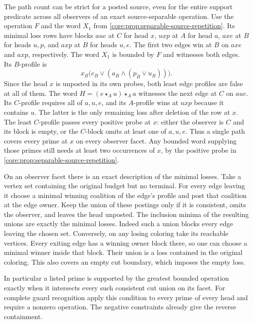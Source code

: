The path count can be strict for a posted source, even for
the entire support predicate across all observers of an exact
source-separable operation. Use the operation $F$
and the word $X_1$ from
\cref{core:prop:separable-source-repetition}.
Its minimal loss rows have blocks $aue$ at $C$ for head $x$,
$uxp$ at $A$ for head $a$, $axe$ at $B$ for heads $u,p$,
and $axp$ at $B$ for heads $u,e$.
The first two edges win at $B$ on $axe$ and $axp$, respectively.
The word $X_1$ is bounded by $F$ and witnesses both edges.
Its $B$-profile is
\[
   x_B\bigl(e_B\vee (a_B\wedge(p_B\vee u_B))\bigr).
\]
Since the head $x$ is unposted in its own probes, both
least edge profiles are false at all of them. The word
$H=(e\star_A u)\star_A a$ witnesses the next edge at $C$
on $aue$. Its $C$-profile requires all of $a,u,e$, and
its $A$-profile wins at $uxp$ because it contains $u$.
The latter is the only remaining loss after deletion of
the row at $x$. The least $C$-profile passes every
positive probe at $x$: either the observer is $C$ and
its block is empty, or the $C$-block omits at least one
of $a,u,e$. Thus a single path covers every prime at $x$
on every observer facet.
Any bounded word supplying those primes still needs at
least two occurrences of $x$, by the positive probe
in \cref{core:prop:separable-source-repetition}.

On an observer facet there is an exact description
of the minimal losses. Take a vertex set containing
the original budget but no terminal. For every edge
leaving it choose a minimal winning coalition of the
edge's profile and post that coalition at the edge
owner. Keep the union of these postings only if it
is consistent, omits the observer, and leaves the head
unposted.
The inclusion minima of the resulting unions are exactly the
minimal losses. Indeed such a union blocks every
edge leaving the chosen set. Conversely, on any
losing coloring take its reachable vertices.
Every exiting edge has a winning owner block there,
so one can choose a minimal winner inside that
block. Their union is a loss contained in the
original coloring. This also covers an empty cut
boundary, which imposes the empty loss.

In particular a listed prime is supported by the
greatest bounded operation exactly when it intersects
every such consistent cut union on its facet.
For complete guard recognition apply this condition
to every prime of every head and require a nonzero
operation. The negative constraints already give
the reverse containment.

